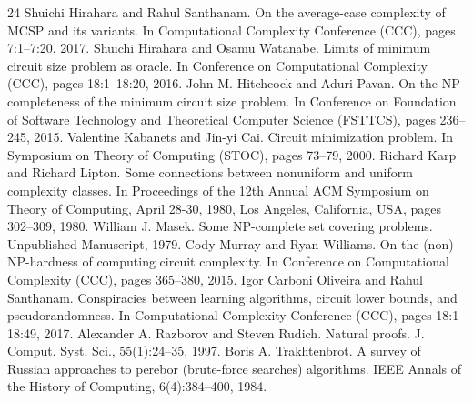 \begin{thebibliography}{24}
Shuichi Hirahara and Rahul Santhanam. On the average-case complexity of MCSP and its variants. In Computational Complexity Conference (CCC), pages 7:1–7:20, 2017.
Shuichi Hirahara and Osamu Watanabe. Limits of minimum circuit size problem as oracle. In Conference on Computational Complexity (CCC), pages 18:1–18:20, 2016.
John M. Hitchcock and Aduri Pavan. On the NP-completeness of the minimum circuit size problem. In Conference on Foundation of Software Technology and Theoretical Computer Science (FSTTCS), pages 236–245, 2015.
Valentine Kabanets and Jin-yi Cai. Circuit minimization problem. In Symposium on Theory of Computing (STOC), pages 73–79, 2000.
Richard Karp and Richard Lipton. Some connections between nonuniform and uniform complexity classes. In Proceedings of the 12th Annual ACM Symposium on Theory of Computing, April 28-30, 1980, Los Angeles, California, USA, pages 302–309, 1980.
William J. Masek. Some NP-complete set covering problems. Unpublished Manuscript, 1979.
Cody Murray and Ryan Williams. On the (non) NP-hardness of computing circuit complexity. In Conference on Computational Complexity (CCC), pages 365–380, 2015.
Igor Carboni Oliveira and Rahul Santhanam. Conspiracies between learning algorithms, circuit lower bounds, and pseudorandomness. In Computational Complexity Conference (CCC), pages 18:1–18:49, 2017.
Alexander A. Razborov and Steven Rudich. Natural proofs. J. Comput. Syst. Sci., 55(1):24–35, 1997.
Boris A. Trakhtenbrot. A survey of Russian approaches to perebor (brute-force searches) algorithms. IEEE Annals of the History of Computing, 6(4):384–400, 1984.
\end{thebibliography}
